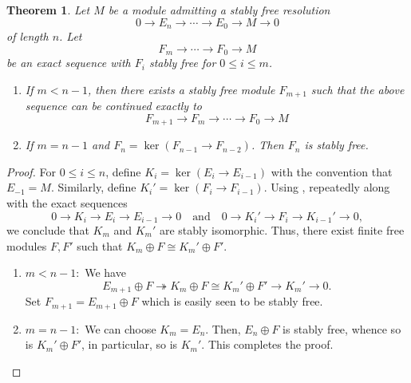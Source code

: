 \documentclass[12pt]{article}
\theoremstyle{thmstyle}
\newtheorem{theorem}{Theorem}[section]
\theoremstyle{defstyle}
\newcommand{\onto}{\twoheadrightarrow}
\renewcommand{\le}{\leqslant}
\begin{document}
\begin{theorem}
    Let $M$ be a module admitting a stably free resolution 
    \begin{equation*}
        0\to E_n\to\cdots\to E_0\to M\to 0
    \end{equation*}
    of length $n$. Let 
    \begin{equation*}
        F_m\to\cdots\to F_0\to M
    \end{equation*}
    be an exact sequence with $F_i$ stably free for $0\le i\le m$. 
    \begin{enumerate}[label=(\alph*)]
        \item If $m < n - 1$, then there exists a stably free module $F_{m + 1}$ such that the above sequence can be continued exactly to 
        \begin{equation*}
            F_{m + 1}\to F_m\to\cdots\to F_0\to M
        \end{equation*}
        \item If $m = n - 1$ and $F_n = \ker\left(F_{n - 1}\to F_{n - 2}\right)$. Then $F_n$ is stably free.
    \end{enumerate}
\end{theorem}
\begin{proof}
    For $0\le i\le n$, define $K_i = \ker(E_i\to E_{i - 1})$ with the convention that $E_{-1} = M$. Similarly, define $K_i' = \ker(F_{i}\to F_{i - 1})$. Using , repeatedly along with the exact sequences 
    \begin{equation*}
        0\to K_i\to E_i\to E_{i - 1}\to 0\quad\text{and}\quad 0\to K_i'\to F_i\to K_{i - 1}'\to 0,
    \end{equation*}
    we conclude that $K_m$ and $K_m'$ are stably isomorphic. Thus, there exist finite free modules $F, F'$ such that $K_m\oplus F\cong K_m'\oplus F'$.

    \begin{enumerate}[label=(\alph*)]
    \item $m < n - 1 : $ We have 
    \begin{equation*}
        E_{m + 1}\oplus F\onto K_m\oplus F\cong K_m'\oplus F'\to K_m'\to 0.
    \end{equation*}
    Set $F_{m + 1} = E_{m + 1}\oplus F$ which is easily seen to be stably free.

    \item $m = n - 1:$ We can choose $K_m = E_n$. Then, $E_n\oplus F$ is stably free, whence so is $K_m'\oplus F'$, in particular, so is $K_m'$. This completes the proof. \qedhere
    \end{enumerate}
\end{proof}
\end{document}
